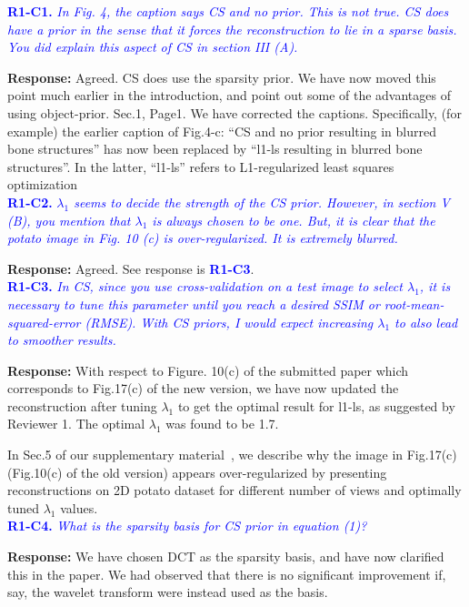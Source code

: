 \documentclass{article}
\begin{document}
\textcolor{blue}{\textbf{R1-C1.}\textit{ In Fig. 4, the caption says CS and no prior. This is not true. CS does have a prior in the sense that it forces the reconstruction to lie in a sparse basis. You did explain this aspect of CS in section III (A).}}

\textbf{Response:} Agreed.  CS does use the sparsity prior. We have now moved this point much earlier in the introduction, and point out some of the advantages of using object-prior. Sec.1, Page1. We have corrected the captions. Specifically, (for example) the earlier caption of Fig.4-c: ``CS and no prior resulting in blurred bone structures'' has now been replaced by ``l1-ls resulting in blurred bone structures''. In the latter, ``l1-ls'' refers to L1-regularized least squares optimization \\

\textcolor{blue}{\textbf{R1-C2.}\textit{ $\lambda_1$ seems to decide the strength of the CS prior. However, in section V (B), you mention that $\lambda_1$ is always chosen to be one. But, it is clear that the potato image in Fig. 10 (c) is over-regularized. It is extremely blurred.}}

\textbf{Response:} Agreed. See response is \textcolor{blue}{\textbf{R1-C3}}.\\

\textcolor{blue}{\textbf{R1-C3.}\textit{ In CS, since you use cross-validation on a test image to select $\lambda_1$, it is necessary to tune this parameter until you reach a desired SSIM or root-mean-squared-error (RMSE). With CS priors, I would expect increasing $\lambda_1$ to also lead to smoother results.}}  

\textbf{Response:} With respect to Figure. 10(c) of the submitted paper which corresponds to Fig.17(c) of the new version, we have now updated the reconstruction after tuning $\lambda_1$ to get the optimal result for l1-ls, as suggested by Reviewer 1. The optimal $\lambda_1$ was found to be 1.7. 

In Sec.5 of our supplementary material~\cite{supp_paper}, we describe why the image in Fig.17(c) (Fig.10(c) of the old version) appears over-regularized by presenting reconstructions on 2D potato dataset for different number of views and optimally tuned $\lambda_1$ values.   \\

\textcolor{blue}{\textbf{R1-C4.}\textit{ What is the sparsity basis for CS prior in equation (1)? }}

\textbf{Response:} We have chosen DCT as the sparsity basis, and have now clarified this in the paper. We had observed that there is no significant improvement if, say, the wavelet transform were instead used as the basis.\\
\end{document}
